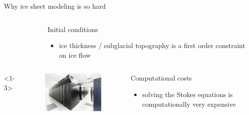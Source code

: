 \documentclass[hide notes,intlimits,unknownkeysallowed]{beamer}
\begin{document}
\begin{frame}{Why ice sheet modeling is so hard}
\begin{columns}[c]
\begin{column}{.28\linewidth}
\begin{figure}
        \end{figure}
      \end{column}
      \begin{column}{.67\linewidth}
        \begin{block}{Initial conditions}
        \begin{itemize}
        \item ice thickness / subglacial topography is a first order constraint on ice flow
        \end{itemize}
      \end{block}
      \end{column}
    \end{columns}
    \begin{columns}[c]<1-3>
      \begin{column}{.3\linewidth}
        \begin{figure}
          \includegraphics[width=\linewidth]{bw_front_sm}
        \end{figure}
      \end{column}
      \begin{column}{.67\linewidth}
        \begin{block}{Computational costs}
        \begin{itemize}
        \item solving the Stokes equations is computationally very expensive
        \end{itemize}
      \end{block}
      \end{column}
    \end{columns}
\end{frame}
\end{document}
